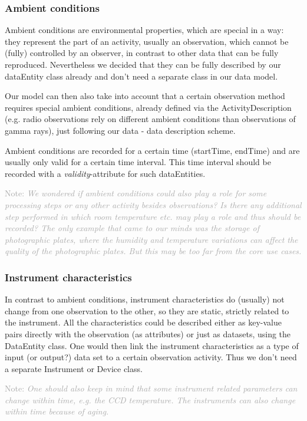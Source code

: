 \documentclass[11pt,a4paper]{ivoa}
\newcommand{\Note}[1]{%
    \noindent%
    \textcolor{darkgrey}{{\sffamily Note:} \emph{#1}}%
}
\begin{document}
\subsubsection{Ambient conditions}
Ambient conditions are environmental properties, which are special in a way: 
they represent the part of an activity, usually an observation, which cannot be 
(fully) controlled by an
observer, in contrast to other data that can be fully reproduced.
Nevertheless we decided that they can be fully described by our 
dataEntity class already and don't need a separate class in our data model. 

Our model can then also take into account that a certain observation
method requires special ambient conditions, already defined via the 
ActivityDescription (e.g. radio observations rely on different ambient 
conditions than observations
of gamma rays), just following our data - data description scheme.


Ambient conditions are recorded for a certain time (startTime, endTime) and are
usually only valid for a certain time interval. This time interval should be recorded
with a \emph{validity}-attribute for such dataEntities.


\Note{We wondered if ambient conditions could also play a role for some
processing steps or any other activity besides observations? Is there any
additional step performed in which room temperature etc. may play a role and thus
should be recorded? The only example that came to our minds was the storage of
photographic plates, where the humidity and temperature variations can affect the
quality of the photographic plates. But this may be too far from the core use
cases.}



\subsubsection{Instrument characteristics}
In contrast to ambient conditions, instrument characteristics do (usually) not
change from one observation to the other, so they are static, strictly related to
the instrument. 
All the characteristics could be described either as key-value pairs directly with the 
observation (as attributes) or just as datasets, using the DataEntity class. 
One would then 
link the instrument characteristics as a type of input (or output?) data set to a certain 
observation activity. Thus we don't need a separate Instrument or Device class.

\Note{One should also keep in mind that some instrument related parameters can change within time,
e.g. the CCD temperature. The instruments can also change within time because of aging.}
\end{document}
